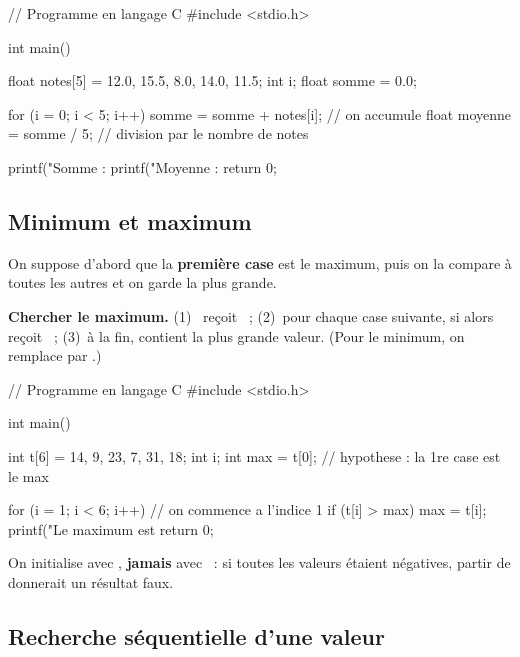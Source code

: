 \begin{codec}
// Programme en langage C
#include <stdio.h>

int main() {
    float notes[5] = {12.0, 15.5, 8.0, 14.0, 11.5};
    int i;
    float somme = 0.0;

    for (i = 0; i < 5; i++) {
        somme = somme + notes[i];   // on accumule
    }
    float moyenne = somme / 5;      // division par le nombre de notes

    printf("Somme   : %
    printf("Moyenne : %
    return 0;
}
\end{codec}


\subsection{Minimum et maximum}

On suppose d'abord que la \textbf{première case} est le maximum, puis on la compare
à toutes les autres et on garde la plus grande.

\begin{methode}
\textbf{Chercher le maximum.} (1)~ reçoit ~; (2)~pour chaque
case suivante, si  alors  reçoit ~; (3)~à la
fin,  contient la plus grande valeur. (Pour le minimum, on remplace
\code{>} par \code{<}.)
\end{methode}

\begin{codec}
// Programme en langage C
#include <stdio.h>

int main() {
    int t[6] = {14, 9, 23, 7, 31, 18};
    int i;
    int max = t[0];     // hypothese : la 1re case est le max

    for (i = 1; i < 6; i++) {       // on commence a l'indice 1
        if (t[i] > max) {
            max = t[i];
        }
    }
    printf("Le maximum est %
    return 0;
}
\end{codec}

\begin{attention}
On initialise  avec , \textbf{jamais} avec ~: si toutes
les valeurs étaient négatives, partir de  donnerait un résultat faux.
\end{attention}

\subsection{Recherche séquentielle d'une valeur}

